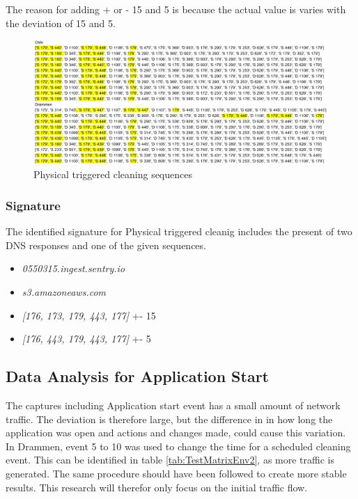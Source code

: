 The reason for adding + or - 15 and 5 is because the actual value is varies with the deviation of 15 and 5.

\begin{figure}[H]
    \centering
    \includegraphics[width=\textwidth]{figures/Sequence_PC.png}
    \caption{Physical triggered cleaning sequences}
    \label{fig:PCseq}
\end{figure}

\subsubsection{Signature}
The identified signature for Physical triggered cleanig includes the present of two DNS responses and one of the given sequences.  

\begin{itemize}
    \item \textit{0550315.ingest.sentry.io}
    \item \textit{s3.amazoneaws.com}
    \item \textit{[176, 173, 179, 443, 177]} +- 15
    \item \textit{[176, 443, 179, 443, 177]} +- 5
\end{itemize}

\subsection{Data Analysis for Application Start}
The captures including Application start event has a small amount of network traffic. The deviation is therefore large, but the difference in in how long the application was open and actions and changes made, could cause this variation. In Drammen, event 5 to 10 was used to change the time for a scheduled cleaning event. This can be identified in table \ref{tab:TestMatrixEnv2}, as more traffic is generated. The same procedure should have been followed to create more stable results. This research will therefor only focus on the initial traffic flow.

